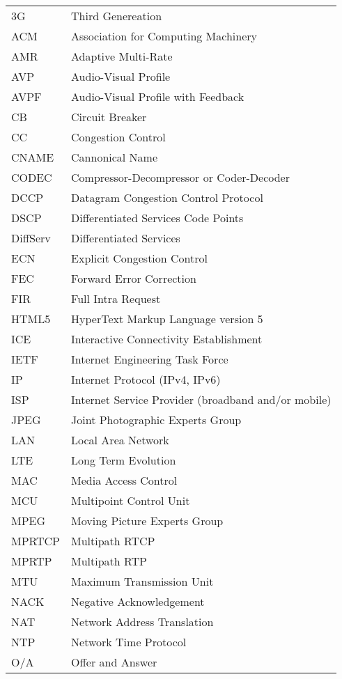 \begin{longtable}{ll}
3G  	& Third Genereation \\
ACM 	& Association for Computing Machinery \\
AMR 	& Adaptive Multi-Rate \\
AVP 	& Audio-Visual Profile \\
AVPF	& Audio-Visual Profile with Feedback \\
CB  	& Circuit Breaker \\
CC  	& Congestion Control \\
CNAME	& Cannonical Name \\
CODEC	& Compressor-Decompressor or Coder-Decoder \\
DCCP 	& Datagram Congestion Control Protocol \\
DSCP 	& Differentiated Services Code Points \\
DiffServ	& Differentiated Services \\
ECN  	& Explicit Congestion Control \\
FEC  	& Forward Error Correction \\
FIR 	& Full Intra Request \\
HTML5	& HyperText Markup Language version 5\\
ICE  	& Interactive Connectivity Establishment \\
IETF	& Internet Engineering Task Force \\
IP  	& Internet Protocol (IPv4, IPv6)\\
ISP 	& Internet Service Provider (broadband and/or mobile) \\
JPEG 	& Joint Photographic Experts Group \\
LAN 	& Local Area Network \\
LTE 	& Long Term Evolution \\
MAC 	& Media Access Control \\
MCU 	& Multipoint Control Unit \\
MPEG 	& Moving Picture Experts Group \\
MPRTCP	& Multipath RTCP \\
MPRTP 	& Multipath RTP \\
MTU  	& Maximum Transmission Unit \\
NACK 	& Negative Acknowledgement \\
NAT 	& Network Address Translation \\
NTP  	& Network Time Protocol \\
O/A  	& Offer and Answer \\

\end{longtable}
